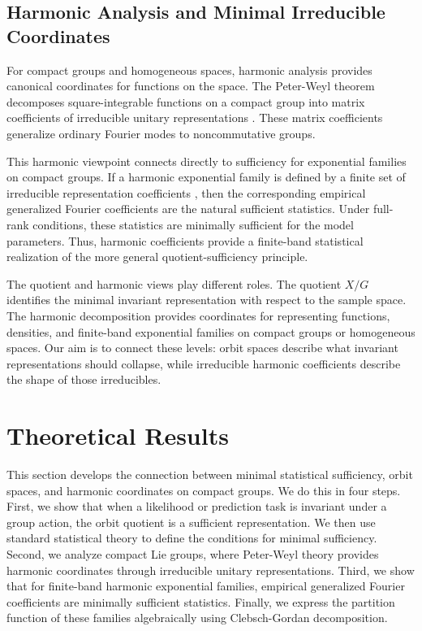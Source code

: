 \documentclass{ssl}
\begin{document}
\subsection{Harmonic Analysis and Minimal Irreducible Coordinates}
For compact groups and homogeneous spaces, harmonic analysis provides canonical coordinates for functions on the space. The Peter-Weyl theorem decomposes square-integrable functions on a compact group into matrix coefficients of irreducible unitary representations \cite{kondor_clebsch-gordan_2018, donkin_clebsch-gordan_2020}. These matrix coefficients generalize ordinary Fourier modes to noncommutative groups.

This harmonic viewpoint connects directly to sufficiency for exponential families on compact groups. If a harmonic exponential family is defined by a finite set of irreducible representation coefficients \cite{cohen_harmonic_2015, tsipidi_harmonic_2025,sundararajan_fourier_2018}, then the corresponding empirical generalized Fourier coefficients are the natural sufficient statistics. Under full-rank conditions, these statistics are minimally sufficient for the model parameters. Thus, harmonic coefficients provide a finite-band statistical realization of the more general quotient-sufficiency principle.

The quotient and harmonic views play different roles. The quotient $X/G$ identifies the minimal invariant representation with respect to the sample space. The harmonic decomposition provides coordinates for representing functions, densities, and finite-band exponential families on compact groups or homogeneous spaces. Our aim is to connect these levels: orbit spaces describe what invariant representations should collapse, while irreducible harmonic coefficients describe the shape of those irreducibles.

\section{Theoretical Results}
This section develops the connection between minimal statistical sufficiency, orbit spaces, and harmonic coordinates on compact groups. We do this in four steps. First, we show that when a likelihood or prediction task is invariant under a group action, the orbit quotient is a sufficient representation. We then use standard statistical theory to define the conditions for minimal sufficiency. Second, we analyze compact Lie groups, where Peter-Weyl theory provides harmonic coordinates through irreducible unitary representations. Third, we show that for finite-band harmonic exponential families, empirical generalized Fourier coefficients are minimally sufficient statistics. Finally, we express the partition function of these families algebraically using Clebsch-Gordan decomposition.
\end{document}
